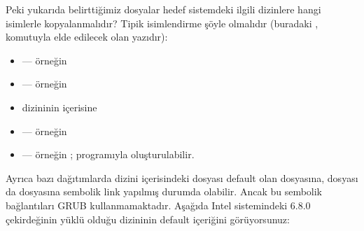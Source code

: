 \documentclass[a4paper,10pt,turkish]{sphinxmanual}
\begin{document}
\sphinxAtStartPar
Peki yukarıda belirttiğimiz dosyalar hedef sistemdeki ilgili dizinlere hangi isimlerle
kopyalanmalıdır? Tipik isimlendirme şöyle olmalıdır (buradaki , 
komutuyla elde edilecek olan yazıdır):
\begin{itemize}
\item {} 
\sphinxAtStartPar
{}  — örneğin 

\item {} 
\sphinxAtStartPar
{}  — örneğin

\item {} 
\sphinxAtStartPar
{}  dizininin içerisine

\item {} 
\sphinxAtStartPar
{}  — örneğin 

\item {} 
\sphinxAtStartPar
{}  — örneğin
;  programıyla oluşturulabilir.

\end{itemize}

\sphinxAtStartPar
Ayrıca bazı dağıtımlarda  dizini içerisindeki  dosyası default olan
 dosyasına,  dosyası da
 dosyasına sembolik link yapılmış durumda olabilir. Ancak bu
sembolik bağlantıları GRUB kullanmamaktadır. Aşağıda Intel sistemindeki 6.8.0 çekirdeğinin yüklü
olduğu  dizininin default içeriğini görüyorsunuz:
\end{document}

